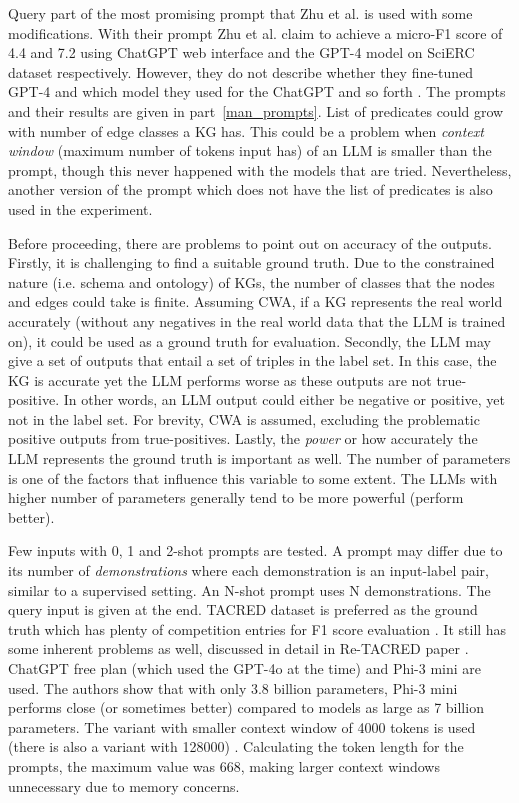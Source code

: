 \documentclass{article}
\begin{document}
Query part of the most promising prompt that Zhu et al. is used with some modifications. With their prompt Zhu et al. claim to achieve a micro-F1 score of 4.4 and 7.2 using ChatGPT web interface and the GPT-4 model on SciERC dataset respectively. However, they do not describe whether they fine-tuned GPT-4 and which model they used for the ChatGPT and so forth \cite{zhu_llms_2024}. The prompts and their results are given in part~\ref{man_prompts}. List of predicates could grow with number of edge classes a KG has. This could be a problem when \textit{context window} (maximum number of tokens input has) of an LLM is smaller than the prompt, though this never happened with the models that are tried. Nevertheless, another version of the prompt which does not have the list of predicates is also used in the experiment.

Before proceeding, there are problems to point out on accuracy of the outputs. Firstly, it is challenging to find a suitable ground truth. Due to the constrained nature (i.e. schema and ontology) of KGs, the number of classes that the nodes and edges could take is finite. Assuming CWA, if a KG represents the real world accurately (without any negatives in the real world data that the LLM is trained on), it could be used as a ground truth for evaluation. Secondly, the LLM may give a set of outputs that entail a set of triples in the label set. In this case, the KG is accurate yet the LLM performs worse as these outputs are not true-positive. In other words, an LLM output could either be negative or positive, yet not in the label set. For brevity, CWA is assumed, excluding the problematic positive outputs from true-positives. Lastly, the \textit{power} or how accurately the LLM represents the ground truth is important as well. The number of parameters is one of the factors that influence this variable to some extent. The LLMs with higher number of parameters generally tend to be more powerful (perform better).

Few inputs with 0, 1 and 2-shot prompts are tested. A prompt may differ due to its number of \textit{demonstrations} where each demonstration is an input-label pair, similar to a supervised setting. An N-shot prompt uses N demonstrations. The query input is given at the end. TACRED dataset is preferred as the ground truth which has plenty of competition entries for F1 score evaluation \cite{zhang_position-aware_2017,noauthor_tacred_nodate}. It still has some inherent problems as well, discussed in detail in Re-TACRED paper \cite{stoica_re-tacred_2021}. ChatGPT free plan (which used the GPT-4o at the time) and Phi-3 mini are used. The authors show that with only 3.8 billion parameters, Phi-3 mini performs close (or sometimes better) compared to models as large as 7 billion parameters. The variant with smaller context window of 4000 tokens is used (there is also a variant with 128000) \cite{abdin_phi-3_2024}. Calculating the token length for the prompts, the maximum value was 668, making larger context windows unnecessary due to memory concerns.
\end{document}
